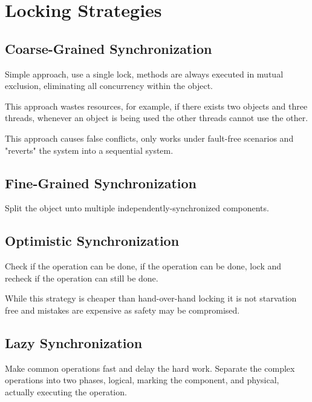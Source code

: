 \section{Locking Strategies}

\subsection{Coarse-Grained Synchronization}
Simple approach, use a single lock,
methods are always executed in mutual exclusion,
eliminating all concurrency within the object.

This approach wastes resources, for example,
if there exists two objects and three threads,
whenever an object is being used the other threads cannot use the other.

This approach causes false conflicts, only works under fault-free scenarios
and "reverts" the system into a sequential system.

\subsection{Fine-Grained Synchronization}
Split the object unto multiple independently-synchronized components.

\subsection{Optimistic Synchronization}
Check if the operation can be done,
if the operation can be done, lock and recheck if the operation can still be done.

While this strategy is cheaper than hand-over-hand locking it is not starvation free and mistakes are expensive as safety may be compromised.

\subsection{Lazy Synchronization}
Make common operations fast and delay the hard work.
Separate the complex operations into two phases,
logical, marking the component,
and physical, actually executing the operation.